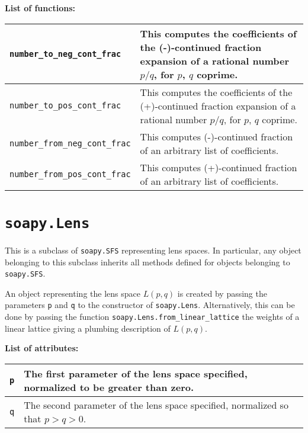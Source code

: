 \documentclass[12pt]{amsart}
\theoremstyle{definition}
\theoremstyle{remark}
\numberwithin{equation}{section}
\begin{document}
\bigskip

\textbf{List of functions:}

\renewcommand{\arraystretch}{1.5}%
\begin{tabularx}{\linewidth}{X X}
\hline
\texttt{number\_to\_neg\_cont\_frac} & This computes the coefficients of the (-)-continued fraction expansion of a rational number $p/q$, for $p$, $q$ coprime.\\
\hline
\texttt{number\_to\_pos\_cont\_frac} & This computes the coefficients of the (+)-continued fraction expansion of a rational number $p/q$, for $p$, $q$ coprime.\\
\hline
\texttt{number\_from\_neg\_cont\_frac} & This computes (-)-continued fraction of an arbitrary list of coefficients.\\
\hline
\texttt{number\_from\_pos\_cont\_frac} & This computes (+)-continued fraction of an arbitrary list of coefficients.\\
\hline
\end{tabularx}

\newpage

\section*{\texttt{soapy.Lens}}

This is a subclass of \texttt{soapy.SFS} representing lens spaces.
In particular, any object belonging to this subclass inherits all methods defined for objects belonging to \texttt{soapy.SFS}.

An object representing the lens space $L(p,q)$ is created by passing the parameters \texttt{p} and \texttt{q} to the constructor of \texttt{soapy.Lens}.
Alternatively, this can be done by passing the function \texttt{soapy.Lens.from\_linear\_lattice} the weights of a linear lattice giving a plumbing description of $L(p,q)$.

\bigskip

\textbf{List of attributes:}

\renewcommand{\arraystretch}{1.5}%
\begin{tabularx}{\linewidth}{X X}
\hline
\texttt{p} & The first parameter of the lens space specified, normalized to be greater than zero.\\
\hline
\texttt{q} & The second parameter of the lens space specified, normalized so that $p> q > 0$.\\
\hline
\end{tabularx}

\bigskip
\end{document}

